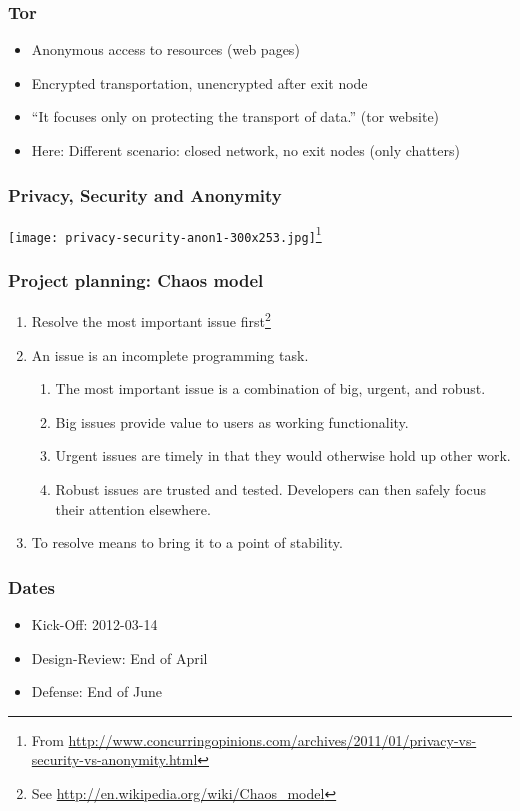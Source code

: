 \documentclass{beamer}
\begin{document}

\frame
{
  \frametitle{Tor}
  \begin{itemize}
    \item Anonymous access to resources (web pages)
    \item Encrypted transportation, unencrypted after exit node
    \item "`It focuses only on protecting the transport of data."' (tor website)
    \item Here: Different scenario: closed network, no exit nodes (only chatters)
  \end{itemize}
}

\frame
{
  \frametitle{Privacy, Security and Anonymity}
    \begin{center}
    \texttt{[image: privacy-security-anon1-300x253.jpg]}\footnote{From \url{http://www.concurringopinions.com/archives/2011/01/privacy-vs-security-vs-anonymity.html}}
    \end{center}
}

\frame
{
  \frametitle{Project planning: Chaos model}
  \begin{enumerate}
     \item Resolve the most important issue first\footnote{See \url{http://en.wikipedia.org/wiki/Chaos_model}}
     \item An issue is an incomplete programming task.
      \begin{enumerate}
         \item The most important issue is a combination of big, urgent, and robust.
         \item Big issues provide value to users as working functionality.
         \item Urgent issues are timely in that they would otherwise hold up other work.
         \item Robust issues are trusted and tested. Developers can then safely focus their attention elsewhere.
      \end{enumerate}
     \item To resolve means to bring it to a point of stability.
  \end{enumerate}
}

\frame
{
  \frametitle{Dates}
  \begin{itemize}
     \item Kick-Off: 2012-03-14
     \item Design-Review: End of April
     \item Defense: End of June
  \end{itemize}
}
\end{document}
